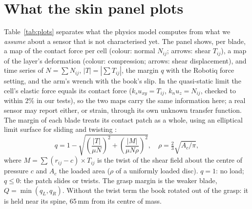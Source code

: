 \documentclass[10pt,twocolumn]{article}
\begin{document}
\section{What the skin panel plots}\label{sec:plots}
Table~\ref{tab:plots} separates what the physics model computes from what we \emph{assume} about a sensor that is
not characterised yet. The panel shows, per blade, a map of the contact force per cell (colour: normal $N_{ij}$;
arrows: shear $T_{ij}$), a map of the layer's deformation (colour: compression; arrows: shear displacement), and
time series of $N=\sum N_{ij}$, $|T|=|\sum T_{ij}|$, the margin $q$ with the Robotiq force setting, and the arm's
wrench with the book's slip. In the quasi-static limit the cell's elastic force equals its contact force
($k_s u_{xy}=T_{ij}$, $k_n u_z=N_{ij}$, checked to within 2\% in our tests), so the two maps carry the same
information here; a real sensor may report either, or strain, through its own unknown transfer function. The
margin of each blade treats its contact patch as a whole, using an elliptical limit surface for sliding and
twisting \cite{goyal1991,howe1996}:
\begin{equation}
q = 1-\sqrt{\left(\frac{|T|}{\mu N}\right)^{2}+\left(\frac{|M|}{\mu N\rho}\right)^{2}},\quad
\rho=\tfrac23\sqrt{A_c/\pi},
\label{eq:q}
\end{equation}
where $M=\sum (r_{ij}-c)\times T_{ij}$ is the twist of the shear field about the centre of pressure $c$ and $A_c$
the loaded area ($\rho$ of a uniformly loaded disc). $q=1$: no load; $q\le0$: the patch slides or twists. The
grasp margin is the weaker blade, $Q=\min(q_L,q_R)$. Without the twist term the book rotated out of the grasp: it
is held near its spine, 65\,mm from its centre of mass.
\end{document}
